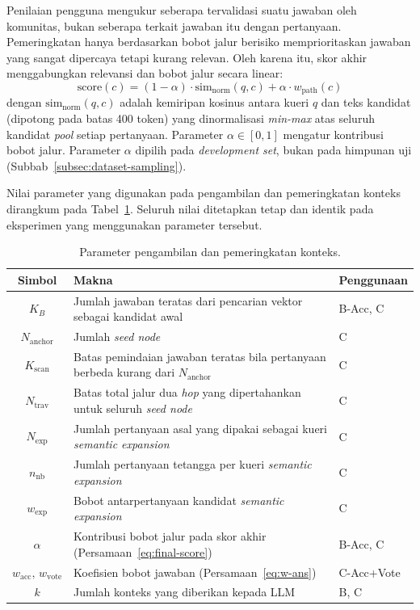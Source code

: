 Penilaian pengguna mengukur seberapa tervalidasi suatu jawaban oleh komunitas, bukan seberapa terkait jawaban itu dengan pertanyaan. Pemeringkatan hanya berdasarkan bobot jalur berisiko memprioritaskan jawaban yang sangat dipercaya tetapi kurang relevan. Oleh karena itu, skor akhir menggabungkan relevansi dan bobot jalur secara linear:
\begin{equation}
\mathrm{score}(c) = (1 - \alpha) \cdot \mathrm{sim}_{\mathrm{norm}}(q, c) + \alpha \cdot w_{\mathrm{path}}(c)
\label{eq:final-score}
\end{equation}
dengan $\mathrm{sim}_{\mathrm{norm}}(q,c)$ adalah kemiripan kosinus antara kueri $q$ dan teks kandidat (dipotong pada batas 400 token) yang dinormalisasi \emph{min-max} atas seluruh kandidat \emph{pool} setiap pertanyaan. Parameter $\alpha \in [0,1]$ mengatur kontribusi bobot jalur. Parameter $\alpha$ dipilih pada \emph{development set}, bukan pada himpunan uji (Subbab~\ref{subsec:dataset-sampling}).

Nilai parameter yang digunakan pada pengambilan dan pemeringkatan konteks dirangkum pada Tabel~\ref{tab:parameter-pengambilan}. Seluruh nilai ditetapkan tetap dan identik pada eksperimen yang menggunakan parameter tersebut. 

\begin{table}[!htbp]
\centering
\caption{Parameter pengambilan dan pemeringkatan konteks.}
\label{tab:parameter-pengambilan}
\small
\begin{tabular}{|c|p{}|p{}|}
\hline
\textbf{Simbol} & \textbf{Makna} & \textbf{Penggunaan} \\
\hline
$K_B$ & Jumlah jawaban teratas dari pencarian vektor sebagai kandidat awal & B-Acc, C \\
\hline
$N_{\mathrm{anchor}}$ & Jumlah \emph{seed node} & C \\
\hline
$K_{\mathrm{scan}}$ & Batas pemindaian jawaban teratas bila pertanyaan berbeda kurang dari $N_{\mathrm{anchor}}$ & C \\
\hline
$N_{\mathrm{trav}}$ & Batas total jalur dua \emph{hop} yang dipertahankan untuk seluruh \emph{seed node} & C \\
\hline
$N_{\mathrm{exp}}$ & Jumlah pertanyaan asal yang dipakai sebagai kueri \emph{semantic expansion} & C \\
\hline
$n_{\mathrm{nb}}$ & Jumlah pertanyaan tetangga per kueri \emph{semantic expansion} & C \\
\hline
$w_{\mathrm{exp}}$ & Bobot antarpertanyaan kandidat \emph{semantic expansion} & C \\
\hline
$\alpha$ & Kontribusi bobot jalur pada skor akhir (Persamaan~\eqref{eq:final-score}) & B-Acc, C \\
\hline
$w_{\mathrm{acc}},\, w_{\mathrm{vote}}$ & Koefisien bobot jawaban (Persamaan~\eqref{eq:w-ans}) & C-Acc+Vote \\
\hline
$k$ & Jumlah konteks yang diberikan kepada LLM & B, C \\
\hline
\end{tabular}
\end{table}

